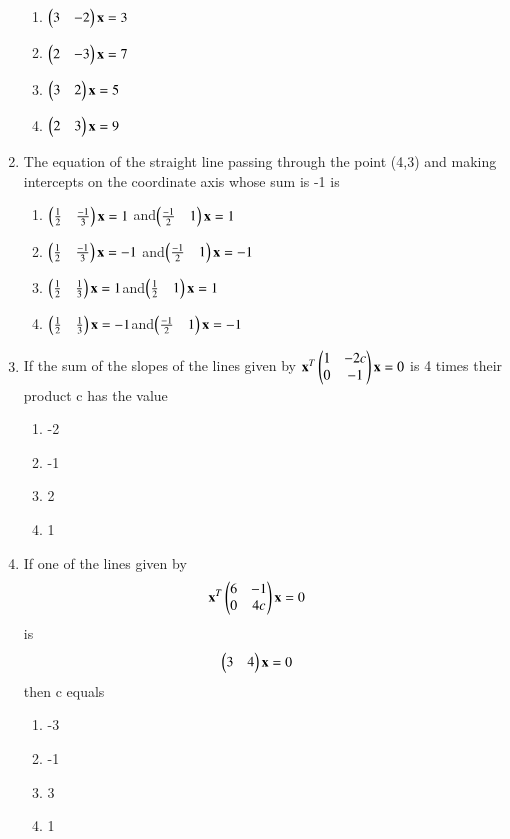 \begin{enumerate}
    \begin{enumerate}
     \item  $\begin{pmatrix}3 & -2\end{pmatrix}\mathbf {x} =3$
     \item  $\begin{pmatrix}2 & -3\end{pmatrix}\mathbf {x} = 7$  
     \item  $\begin{pmatrix}3 & 2\end{pmatrix}\mathbf {x} = 5$
     \item  $\begin{pmatrix}2 & 3\end{pmatrix}\mathbf {x} = 9$
     \end{enumerate}
    \item The equation of the straight line passing through the point (4,3) and making intercepts on the coordinate axis whose sum is -1 is
    \begin{enumerate}
     \item $\begin{pmatrix}{\frac{1}{2}} & {\frac{-1}{3}}\end{pmatrix} \mathbf {x} = 1$ and$ \begin{pmatrix}{\frac{-1}{2}} & 1\end{pmatrix} \mathbf {x} = 1$
     \item $\begin{pmatrix}{\frac{1}{2}} & {\frac{-1}{3}}\end{pmatrix} \mathbf {x} = -1$ and$ \begin{pmatrix}{\frac{-1}{2}} & 1\end{pmatrix} \mathbf {x} = -1$
     \item $\begin{pmatrix}{\frac{1}{2}} & {\frac{1}{3}}\end{pmatrix} \mathbf {x} = 1 $and$ \begin{pmatrix}{\frac{1}{2}} & 1\end{pmatrix} \mathbf {x} = 1$
     \item $\begin{pmatrix}{\frac{1}{2}} & {\frac{1}{3}}\end{pmatrix} \mathbf {x} = -1 $and$ \begin{pmatrix}{\frac{-1}{2}} & 1\end{pmatrix} \mathbf {x} =-1$
     \end{enumerate}
    \item If the sum of the slopes of the lines given by $\mathbf {x}^T \begin{pmatrix}1 & -2c \\ 0 & -1\end{pmatrix} \mathbf {x} = 0$ is 4 times their product c has the value
    \begin{enumerate}
     \item  -2 
     \item  -1 
     \item  2
     \item  1
     \end{enumerate}
    \item If one of the lines given by \begin{align}\mathbf {x}^T \begin{pmatrix}6 & -1 \\ 0 & 4c\end{pmatrix} \mathbf {x} &= 0\end{align} is \begin{align}\begin{pmatrix} 3 & 4\end{pmatrix} \mathbf {x} &= 0\end{align} then c equals 
    \begin{enumerate}
     \item  -3 
     \item  -1 
     \item  3
     \item  1

\end{enumerate}
\end{enumerate}
